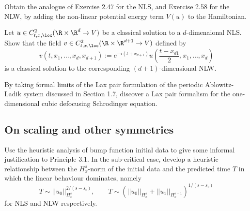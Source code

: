 \begin{statement}
	Obtain the analogue of Exercise 2.47 for the NLS, and Exercise 2.58 for the NLW, by adding the non-linear potential energy term $V(u)$ to the Hamiltonian. 
\end{statement}

\begin{solution}

\end{solution}

\begin{statement}
	Let $u \in C^2_{t, x, \loc} (\R \times \R^d \to V)$ be a classical solution to a $d$-dimenaional NLS. Show that the field $v \in C^2_{t, x, \loc} (\R \times \R^{d + 1} \to V)$ defined by 
		\[ v(t, x_1, \dots, x_d, x_{d + 1}) := e^{-i (t + x_{d + 1})} u\left( \frac{t - x_{d  1}}{2}, x_1, \dots, x_d \right) \]
	is a classical solution to the corresponding $(d + 1)$-dimensional NLW.	
\end{statement}

\begin{solution}

\end{solution}


\begin{statement}
	By taking formal limits of the Lax pair formulation of the periodic Ablowitz-Ladik system discussed in Section 1.7, discover a Lax pair formalism for the one-dimensional cubic defocusing Schrodinger equation. 
\end{statement}

\begin{solution}

\end{solution}


\subsection{On scaling and other symmetries}
\begin{statement}
	Use the heuristic analysis of bump function initial data to give some informal justification to Principle 3.1. In the sub-critical case, develop a heuristic relationship between the $H^s_x$-norm of the initial data and the predicted time $T$ in which the linear behaviour dominates, namely 
		\[ T \sim ||u_0||_{H^s_x}^{2/(s - s_c)}, \qquad T \sim (||u_0||_{H^s_x} + ||u_1||_{H^{s - 1}_x})^{1/(s - s_c)}\]
	for NLS and NLW respectively. 	
\end{statement}

